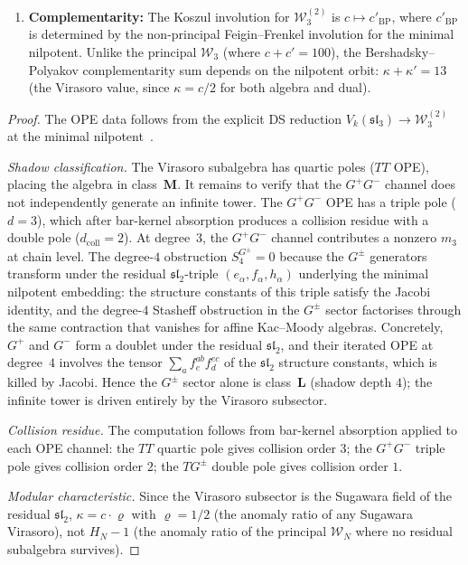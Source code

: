 \begin{proposition}
\begin{enumerate}[label=\textup{(\roman*)},nosep]
\item \textbf{Complementarity:}
 The Koszul involution for $\mathcal{W}_3^{(2)}$ is
 $c \mapsto c'_{\mathrm{BP}}$, where $c'_{\mathrm{BP}}$ is determined
 by the non-principal Feigin--Frenkel involution for the minimal
 nilpotent. Unlike the principal $\mathcal{W}_3$
 \textup{(}where $c + c' = 100$\textup{)}, the
 Bershadsky--Polyakov complementarity sum depends on the nilpotent
 orbit: $\kappa + \kappa' = 13$ \textup{(}the Virasoro value,
 since $\kappa = c/2$ for both algebra and dual\textup{)}.
\end{enumerate}
\end{proposition}

\begin{proof}
The OPE data follows from the explicit DS reduction
$V_k(\mathfrak{sl}_3) \to \mathcal{W}_3^{(2)}$
at the minimal nilpotent~\cite{Ara07}.

\emph{Shadow classification.} The Virasoro subalgebra has quartic
poles ($TT$ OPE), placing the algebra in class~$\mathbf{M}$.
It remains to verify that the $G^+G^-$ channel does not independently
generate an infinite tower. The $G^+G^-$ OPE has a triple pole
($d = 3$), which after bar-kernel absorption produces a
collision residue with a double pole ($d_{\mathrm{coll}} = 2$).
At degree~$3$, the $G^+G^-$ channel contributes a nonzero $m_3$
at chain level. The degree-$4$ obstruction
$S_4^{G^\pm} = 0$ because the $G^\pm$ generators transform
under the residual $\mathfrak{sl}_2$-triple
$(e_\alpha, f_\alpha, h_\alpha)$ underlying the minimal
nilpotent embedding: the structure constants of this triple
satisfy the Jacobi identity, and the degree-$4$ Stasheff
obstruction in the $G^\pm$ sector factorises through the
same contraction that vanishes for affine Kac--Moody algebras.
Concretely, $G^+$ and $G^-$ form a doublet under the
residual $\mathfrak{sl}_2$, and their iterated OPE at
degree~$4$ involves the tensor
$\sum_a f^{ab}_e f^{ec}_d$ of the $\mathfrak{sl}_2$ structure
constants, which is killed by Jacobi. Hence the $G^\pm$
sector alone is class~$\mathbf{L}$ (shadow depth $4$); the
infinite tower is driven entirely by the Virasoro subsector.

\emph{Collision residue.} The computation follows from
bar-kernel absorption applied to each OPE channel:
the $TT$ quartic pole gives collision order $3$; the $G^+G^-$
triple pole gives collision order $2$; the $TG^\pm$
double pole gives collision order $1$.

\emph{Modular characteristic.} Since the Virasoro subsector
is the Sugawara field of the residual $\mathfrak{sl}_2$,
$\kappa = c \cdot \varrho$ with $\varrho = 1/2$
(the anomaly ratio of any Sugawara Virasoro), not
$H_N - 1$ (the anomaly ratio of the principal
$\mathcal{W}_N$ where no residual subalgebra survives).
\end{proof}

